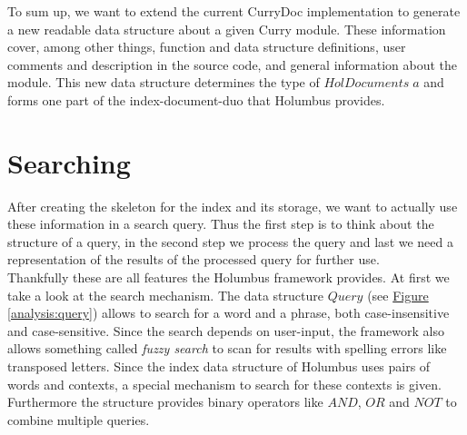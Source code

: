 \documentclass[%
	pdftex,%
	a4paper,%
	oneside,%
	chapterprefix,%
	headsepline,%
	12pt%
]{scrbook}
\newcommand{\Conid}[1]{\mathit{#1}}
\newcommand{\Varid}[1]{\mathit{#1}}
\begin{document}
To sum up, we want to extend the current CurryDoc implementation to
generate a new readable data structure about a given Curry module. %
These information cover, among other things, function and data
structure definitions, user comments and description in the source
code, and general information about the module. %
This new data structure determines the type of \ensuremath{\Conid{HolDocuments}\;\Varid{a}} and
forms one part of the index-document-duo that Holumbus provides. %

\section{Searching}
After creating the skeleton for the index and its storage, we want to
actually use these information in a search query. %
Thus the first step is to think about the structure of a query, in the
second step we process the query and last we need a representation of
the results of the processed query for further use.\\

Thankfully these are all features the Holumbus framework provides. At
first we take a look at the search mechanism. %
The data structure \ensuremath{\Conid{Query}} (see \hyperref[analysis:query]{Figure
  \ref{analysis:query}}) allows to search for a word and a phrase,
both case-insensitive and case-sensitive. %
Since the search depends on user-input, the framework also allows
something called \emph{fuzzy search} to scan for results with spelling
errors like transposed letters. %
Since the index data structure of Holumbus uses pairs of words and
contexts, a special mechanism to search for these contexts is given. %
Furthermore the structure provides binary operators like \ensuremath{\Conid{AND}}, \ensuremath{\Conid{OR}}
and \ensuremath{\Conid{NOT}} to combine multiple queries. %
\end{document}
